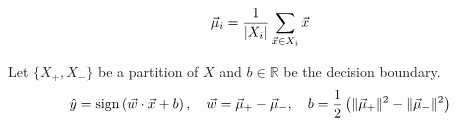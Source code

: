 \documentclass[a4paper]{extarticle}
\begin{document}
\begin{dfn}
  \begin{equation}
    \vec{\mu}_{i} = \frac{1}{|X_{i}|} \sum_{\vec{x} \in X_{i}} \vec{x}
  \end{equation}
\end{dfn}

\begin{dfn}
  Let $\{ X_{+}, X_{-} \}$ be a partition of $X$
  and $b \in \mathbb{R}$ be the decision boundary.
  \begin{equation}
    \hat{y} = \operatorname{sign} \left( \vec{w} \cdot \vec{x} + b \right)
    , \quad
    \vec{w} = \vec{\mu}_{+} - \vec{\mu}_{-}
    , \quad
    b = \frac{1}{2} \left( \lVert \vec{\mu}_{+} \rVert^{2} - \lVert \vec{\mu}_{-} \rVert^{2} \right)
  \end{equation}
\end{dfn}
\end{document}
